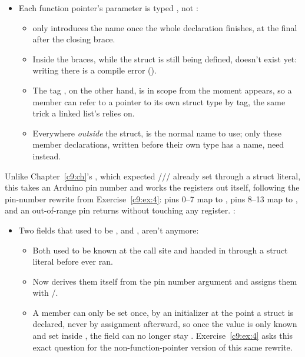 \begin{itemize}
  \item Each function pointer's  parameter is typed , not
    :
  \begin{itemize}
    \item {} only introduces the name  once
      the whole declaration finishes, at the final \code{;} after the closing brace.
    \item Inside the braces, while the struct is still being defined,  doesn't exist
      yet: writing  there is a compile error
      ().
    \item The tag , on the other hand, is in scope from the moment
       appears, so a member can refer to a pointer to its own struct type by
      tag, the same trick a linked list's  relies on.
    \item Everywhere \emph{outside} the struct,  is the normal name to use; only these
      member declarations, written before their own type has a name, need 
      instead.
  \end{itemize}
\end{itemize}
Unlike Chapter~\ref{c9:ch}'s , which expected
/// already set through a struct literal, this
 takes an Arduino pin number and works the registers out itself,
following the pin-number rewrite from Exercise~\ref{c9:ex:4}: pins 0--7 map to , pins
8--13 map to , and an out-of-range pin returns  without touching any
register. :


\begin{itemize}
  \item Two fields that used to be ,  and , aren't anymore:
  \begin{itemize}
    \item Both used to be known at the call site and handed in through a struct literal before
       ever ran.
    \item Now  derives them itself from the pin number argument and assigns them
      with /.
    \item A  member can only be set once, by an initializer at the point a struct is
      declared, never by assignment afterward, so once the value is only known and set inside
      , the field can no longer stay . Exercise~\ref{c9:ex:4} asks
      this exact question for the non-function-pointer version of this same rewrite.
  \end{itemize}
\end{itemize}


